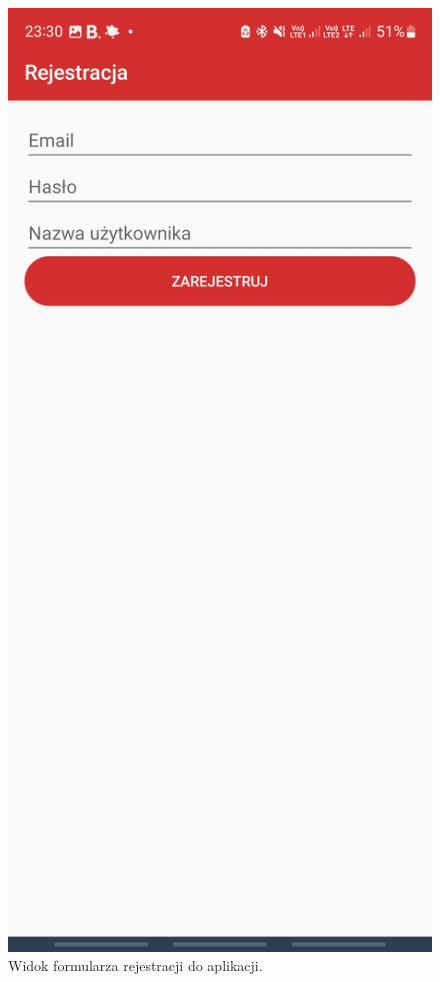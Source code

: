 \begin{figure}[H]
    \centering
    \includegraphics[scale=0.15]{img/imp/widok-reje.jpg}
    \caption{Widok formularza rejestracji do aplikacji.}
    \label{widok:register}
\end{figure}
